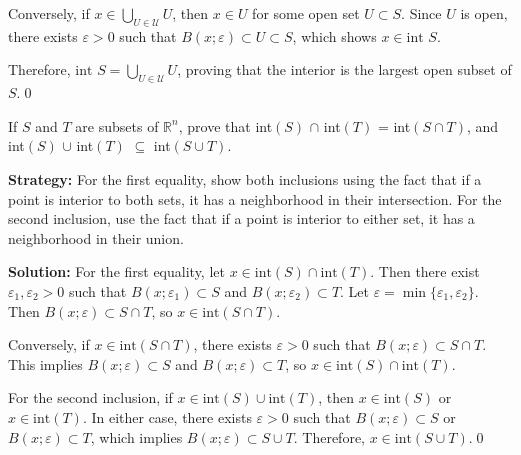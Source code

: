 Conversely, if $x \in \bigcup_{U \in \mathcal{U}} U$, then $x \in U$ for some open set $U \subset S$. Since $U$ is open, there exists $\varepsilon > 0$ such that $B(x;\varepsilon) \subset U \subset S$, which shows $x \in \text{int } S$.

Therefore, $\text{int } S = \bigcup_{U \in \mathcal{U}} U$, proving that the interior is the largest open subset of $S$.\qed


\begin{problembox}
\begin{problemstatement}
If $S$ and $T$ are subsets of $\mathbb{R}^n$, prove that
int$(S)$ $\cap$ int$(T)$ = int$(S \cap T)$,
and int$(S)$ $\cup$ int$(T)$ $\subseteq$ int$(S \cup T)$.
\end{problemstatement}
\end{problembox}    

\noindent\textbf{Strategy:} For the first equality, show both inclusions using the fact that if a point is interior to both sets, it has a neighborhood in their intersection. For the second inclusion, use the fact that if a point is interior to either set, it has a neighborhood in their union.

\bigskip\noindent\textbf{Solution:} For the first equality, let $x \in \text{int}(S) \cap \text{int}(T)$. Then there exist $\varepsilon_1, \varepsilon_2 > 0$ such that $B(x;\varepsilon_1) \subset S$ and $B(x;\varepsilon_2) \subset T$. Let $\varepsilon = \min\{\varepsilon_1, \varepsilon_2\}$. Then $B(x;\varepsilon) \subset S \cap T$, so $x \in \text{int}(S \cap T)$.

Conversely, if $x \in \text{int}(S \cap T)$, there exists $\varepsilon > 0$ such that $B(x;\varepsilon) \subset S \cap T$. This implies $B(x;\varepsilon) \subset S$ and $B(x;\varepsilon) \subset T$, so $x \in \text{int}(S) \cap \text{int}(T)$.

For the second inclusion, if $x \in \text{int}(S) \cup \text{int}(T)$, then $x \in \text{int}(S)$ or $x \in \text{int}(T)$. In either case, there exists $\varepsilon > 0$ such that $B(x;\varepsilon) \subset S$ or $B(x;\varepsilon) \subset T$, which implies $B(x;\varepsilon) \subset S \cup T$. Therefore, $x \in \text{int}(S \cup T)$.\qed


